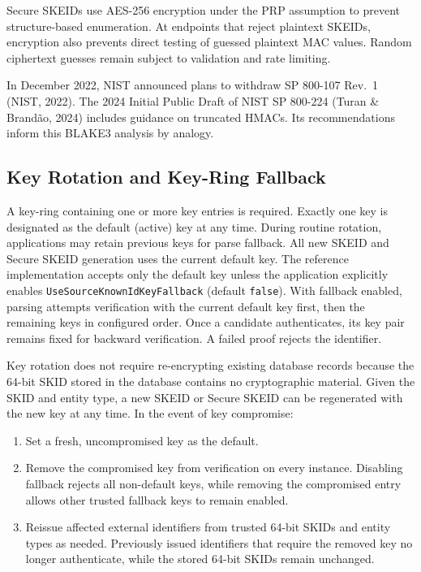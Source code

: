 \documentclass[fleqn,10pt,lineno]{wlpeerj}
\providecommand{\tightlist}{%
  \setlength{\itemsep}{0pt}\setlength{\parskip}{0pt}}
\begin{document}
Secure SKEIDs use AES-256 encryption under the PRP assumption to prevent
structure-based enumeration. At endpoints that reject plaintext SKEIDs,
encryption also prevents direct testing of guessed plaintext MAC values.
Random ciphertext guesses remain subject to validation and rate
limiting.

In December 2022, NIST announced plans to withdraw SP 800-107 Rev.~1
(NIST, 2022). The 2024 Initial Public Draft of NIST SP 800-224 (Turan \&
Brandão, 2024) includes guidance on truncated HMACs. Its recommendations
inform this BLAKE3 analysis by analogy.

\subsection{Key Rotation and Key-Ring
Fallback}\label{key-rotation-and-key-ring-fallback}

A key-ring containing one or more key entries is required. Exactly one
key is designated as the default (active) key at any time. During
routine rotation, applications may retain previous keys for parse
fallback. All new SKEID and Secure SKEID generation uses the current
default key. The reference implementation accepts only the default key
unless the application explicitly enables
\texttt{UseSourceKnownIdKeyFallback} (default \texttt{false}). With
fallback enabled, parsing attempts verification with the current default
key first, then the remaining keys in configured order. Once a candidate
authenticates, its key pair remains fixed for backward verification. A
failed proof rejects the identifier.

Key rotation does not require re-encrypting existing database records
because the 64-bit SKID stored in the database contains no cryptographic
material. Given the SKID and entity type, a new SKEID or Secure SKEID
can be regenerated with the new key at any time. In the event of key
compromise:

\begin{enumerate}
\def\labelenumi{\arabic{enumi}.}
\tightlist
\item
  Set a fresh, uncompromised key as the default.
\item
  Remove the compromised key from verification on every instance.
  Disabling fallback rejects all non-default keys, while removing the
  compromised entry allows other trusted fallback keys to remain
  enabled.
\item
  Reissue affected external identifiers from trusted 64-bit SKIDs and
  entity types as needed. Previously issued identifiers that require the
  removed key no longer authenticate, while the stored 64-bit SKIDs
  remain unchanged.
\end{enumerate}
\end{document}
